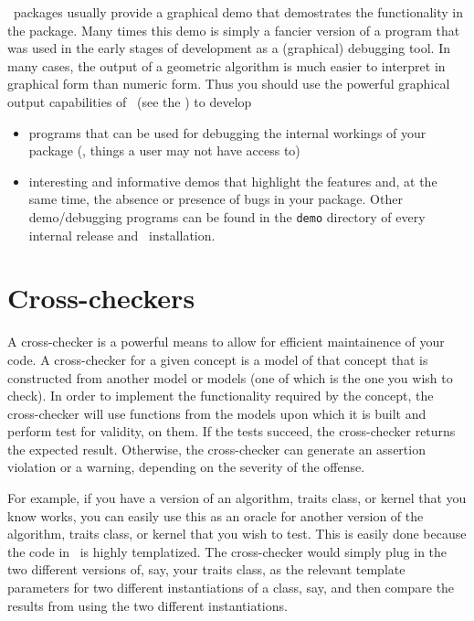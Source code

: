 \cgal\ packages usually provide a graphical demo that demostrates the 
functionality in the package.  Many times this demo is simply a fancier
version of a program that was used in the early stages of development as a
(graphical) debugging tool.  In many cases, the output of a geometric
algorithm is much easier to interpret in graphical form than numeric
form.  Thus you should use the powerful graphical output capabilities
of \cgal\ (see the ) 
to develop 
\begin{itemize}
   \item programs that can be used for debugging the internal workings
         of your package (\ie, things a user may not have access to)
   \item interesting and informative demos that highlight the features and, 
         at the same time, the absence or presence of bugs in your package.  
         Other demo/debugging programs can be found in the \texttt{demo} 
         directory 
         of every internal release and \cgal\ installation.
\end{itemize}

\section{Cross-checkers}
\label{sec:debugging_cross_checker}

A cross-checker is a powerful means to allow for efficient maintainence 
of your code.  A cross-checker for a given concept is a model of that concept
that is constructed from another model or models (one of which is the one
you wish to check).  In order to implement the functionality required by
the concept, the cross-checker will use functions from the models upon
which it is built and perform test for validity, \etc on them.  If the tests
succeed, the cross-checker returns the expected result.  Otherwise, the
cross-checker can generate an assertion violation or a warning, depending
on the severity of the offense. 

For example, if you have a version of an algorithm, traits class, or kernel 
that you know works, you can easily use this as an oracle for another version 
of the algorithm, traits class, or kernel that you wish to test.  This is
easily done because the code in \cgal\ is highly templatized.  The cross-checker
would simply plug in the two different versions of, say, your traits class, as 
the relevant template parameters for two different instantiations of a
class, say, and then compare the results from using the two different 
instantiations.

